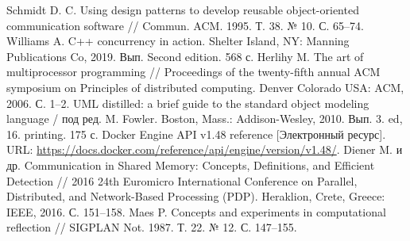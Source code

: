 \documentclass[a4paper, 14pt]{extreport}
\begin{document}
\begin{thebibliography}{9}
         Schmidt D. C. Using design patterns to develop reusable object-oriented communication software // Commun. ACM. 1995. Т. 38. № 10. С. 65–74.
         Williams A. C++ concurrency in action. Shelter Island, NY: Manning Publications Co, 2019. Вып. Second edition. 568 с.
          Herlihy M. The art of multiprocessor programming // Proceedings of the twenty-fifth annual ACM symposium on Principles of distributed computing. Denver Colorado USA: ACM, 2006. С. 1–2.
         UML distilled: a brief guide to the standard object modeling language / под ред. M. Fowler. Boston, Mass.: Addison-Wesley, 2010. Вып. 3. ed, 16. printing. 175 с.
         Docker Engine API v1.48 reference [Электронный ресурс]. URL: \url{https://docs.docker.com/reference/api/engine/version/v1.48/}.
         Diener M. и др. Communication in Shared Memory: Concepts, Definitions, and Efficient Detection // 2016 24th Euromicro International Conference on Parallel, Distributed, and Network-Based Processing (PDP). Heraklion, Crete, Greece: IEEE, 2016. С. 151–158.
         Maes P. Concepts and experiments in computational reflection // SIGPLAN Not. 1987. Т. 22. № 12. С. 147–155.

\end{thebibliography} 
\end{document}

